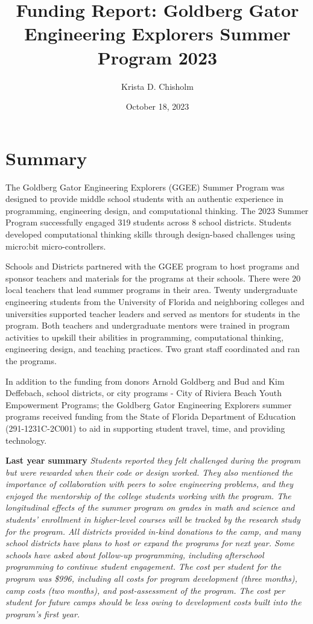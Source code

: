 \documentclass[
]{article}
\title{Funding Report: Goldberg Gator Engineering Explorers Summer
Program 2023}
\author{Krista D. Chisholm}
\date{October 18, 2023}
\begin{document}
\maketitle

{
\setcounter{tocdepth}{2}
\tableofcontents
}
\hypertarget{summary}{%
\section{Summary}\label{summary}}

The Goldberg Gator Engineering Explorers (GGEE) Summer Program was
designed to provide middle school students with an authentic experience
in programming, engineering design, and computational thinking. The 2023
Summer Program successfully engaged 319 students across 8 school
districts. Students developed computational thinking skills through
design-based challenges using micro:bit micro-controllers.

Schools and Districts partnered with the GGEE program to host programs
and sponsor teachers and materials for the programs at their schools.
There were 20 local teachers that lead summer programs in their area.
Twenty undergraduate engineering students from the University of Florida
and neighboring colleges and universities supported teacher leaders and
served as mentors for students in the program. Both teachers and
undergraduate mentors were trained in program activities to upskill
their abilities in programming, computational thinking, engineering
design, and teaching practices. Two grant staff coordinated and ran the
programs.

In addition to the funding from donors Arnold Goldberg and Bud and Kim
Deffebach, school districts, or city programs - City of Riviera Beach
Youth Empowerment Programs; the Goldberg Gator Engineering Explorers
summer programs received funding from the State of Florida Department of
Education (291-1231C-2C001) to aid in supporting student travel, time,
and providing technology.

\textbf{Last year summary} \emph{Students reported they felt challenged
during the program but were rewarded when their code or design worked.
They also mentioned the importance of collaboration with peers to solve
engineering problems, and they enjoyed the mentorship of the college
students working with the program. The longitudinal effects of the
summer program on grades in math and science and students' enrollment in
higher-level courses will be tracked by the research study for the
program. All districts provided in-kind donations to the camp, and many
school districts have plans to host or expand the programs for next
year. Some schools have asked about follow-up programming, including
afterschool programming to continue student engagement. The cost per
student for the program was \$996, including all costs for program
development (three months), camp costs (two months), and post-assessment
of the program. The cost per student for future camps should be less
owing to development costs built into the program's first year.}
\end{document}

